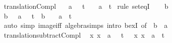 \begin{isabellebody}
\isanewline
{}\isamarkupfalse%
\ translation{\isacharunderscore}{\kern0pt}Compl{\isacharcolon}{\kern0pt}\isanewline
\ \ {\isachardoublequoteopen}{\isacharparenleft}{\kern0pt}{\isacharplus}{\kern0pt}{\isacharparenright}{\kern0pt}\ a\ {\isacharbackquote}{\kern0pt}\ {\isacharparenleft}{\kern0pt}{\isacharminus}{\kern0pt}\ t{\isacharparenright}{\kern0pt}\ {\isacharequal}{\kern0pt}\ {\isacharminus}{\kern0pt}\ {\isacharparenleft}{\kern0pt}{\isacharparenleft}{\kern0pt}{\isacharplus}{\kern0pt}{\isacharparenright}{\kern0pt}\ a\ {\isacharbackquote}{\kern0pt}\ t{\isacharparenright}{\kern0pt}{\isachardoublequoteclose}\isanewline
%
\isadelimproof
%
\endisadelimproof
%
\isatagproof
{}\isamarkupfalse%
\ {\isacharparenleft}{\kern0pt}rule\ set{\isacharunderscore}{\kern0pt}eqI{\isacharparenright}{\kern0pt}\isanewline
\ \ \isamarkupfalse%
\ b\isanewline
\ \ \isamarkupfalse%
\ {\isachardoublequoteopen}b\ {\isasymin}\ {\isacharparenleft}{\kern0pt}{\isacharplus}{\kern0pt}{\isacharparenright}{\kern0pt}\ a\ {\isacharbackquote}{\kern0pt}\ {\isacharparenleft}{\kern0pt}{\isacharminus}{\kern0pt}\ t{\isacharparenright}{\kern0pt}\ {\isasymlongleftrightarrow}\ b\ {\isasymin}\ {\isacharminus}{\kern0pt}\ {\isacharparenleft}{\kern0pt}{\isacharplus}{\kern0pt}{\isacharparenright}{\kern0pt}\ a\ {\isacharbackquote}{\kern0pt}\ t{\isachardoublequoteclose}\isanewline
\ \ \ \ \isamarkupfalse%
\ {\isacharparenleft}{\kern0pt}auto\ simp{\isacharcolon}{\kern0pt}\ image{\isacharunderscore}{\kern0pt}iff\ algebra{\isacharunderscore}{\kern0pt}simps\ intro{\isacharbang}{\kern0pt}{\isacharcolon}{\kern0pt}\ bexI\ {\isacharbrackleft}{\kern0pt}of\ {\isacharunderscore}{\kern0pt}\ {\isachardoublequoteopen}b\ {\isacharminus}{\kern0pt}\ a{\isachardoublequoteclose}{\isacharbrackright}{\kern0pt}{\isacharparenright}{\kern0pt}\isanewline
{}\isamarkupfalse%
%
\endisatagproof
{\isafoldproof}%
%
\isadelimproof
\isanewline
%
\endisadelimproof
\isanewline
{}\isamarkupfalse%
\ translation{\isacharunderscore}{\kern0pt}subtract{\isacharunderscore}{\kern0pt}Compl{\isacharcolon}{\kern0pt}\isanewline
\ \ {\isachardoublequoteopen}{\isacharparenleft}{\kern0pt}{\isasymlambda}x{\isachardot}{\kern0pt}\ x\ {\isacharminus}{\kern0pt}\ a{\isacharparenright}{\kern0pt}\ {\isacharbackquote}{\kern0pt}\ {\isacharparenleft}{\kern0pt}{\isacharminus}{\kern0pt}\ t{\isacharparenright}{\kern0pt}\ {\isacharequal}{\kern0pt}\ {\isacharminus}{\kern0pt}\ {\isacharparenleft}{\kern0pt}{\isacharparenleft}{\kern0pt}{\isasymlambda}x{\isachardot}{\kern0pt}\ x\ {\isacharminus}{\kern0pt}\ a{\isacharparenright}{\kern0pt}\ {\isacharbackquote}{\kern0pt}\ t{\isacharparenright}{\kern0pt}{\isachardoublequoteclose}\isanewline

\end{isabellebody}

